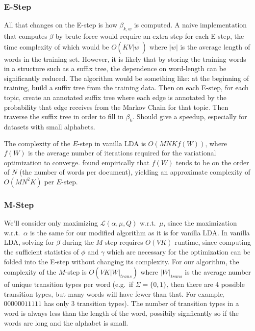 \documentclass[10pt]{article}
\begin{document}
\subsubsection{E-Step}
All that changes on the E-step is how $\beta_{k,w}$ is computed. A naive implementation that computes $\beta$ by brute force would require an extra step for each E-step, the time complexity of which would be $O(K V \overline{|w|})$ where $\overline{|w|}$ is the average length  of words in the training set. However, it is likely that by storing the training words in a structure such as a suffix tree, the dependence on word-length can be significantly reduced. The algorithm would be something like: at the beginning of training, build a suffix tree from the training data. Then on each E-step, for each topic, create an annotated suffix tree where each edge is annotated by the probability that edge receives from the Markov Chain for that topic. Then traverse the suffix tree in order to fill in $\beta_k$. Should give a speedup, especially for datasets with small alphabets.

The complexity of the $E$-step in vanilla LDA is $O(MNKf(W))$, where $f(W)$ is the average number of iterations required for the variational optimization to converge. \citep{blei2003latent} found empirically that $f(W)$ tends to be on the order of $N$ (the number of words per document), yielding an approximate complexity of $O(MN^2K)$ per $E$-step.

\subsubsection{M-Step}
We'll consider only maximizing $\mathcal{L}(\alpha, \mu, Q)$ w.r.t.\ $\mu$, since the maximization w.r.t.\ $\alpha$ is the same for our modified algorithm as it is for vanilla LDA. In vanilla LDA, solving for $\beta$ during the $M$-step requires $O(VK)$ runtime, since computing the sufficient statistics of $\phi$ and $\gamma$ which are necessary for the optimization can be folded into the E-step without changing its complexity. For our algorithm, the complexity of the $M$-step is $O(VK\overline{|W|_{trans}})$ where $\overline{|W|_{trans}}$ is the average number of unique transition types per word (e.g.\ if $\Sigma = \{0, 1\}$, then there are 4 possible transition types, but many words will have fewer than that. For example, $00000011111$ has only 3 transition types). The number of transition types in a word is always less than the length of the word, possibily signficantly so if the words are long and the alphabet is small.
\end{document}
